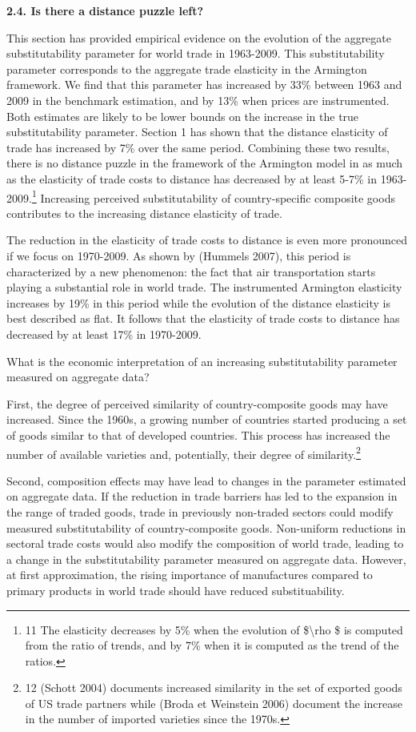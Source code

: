 \documentclass[12pt,twoside,a4paper,notitlepage]{article}
\begin{document}
\textbf{2.4. Is there a distance puzzle left? \label{mark-2.4.}}

This section has provided empirical evidence on the evolution of the aggregate substitutability parameter for world trade in 1963-2009. This substitutability parameter corresponds to the aggregate trade elasticity in the Armington framework. We find that this parameter has increased by 33\% between 1963 and 2009 in the benchmark estimation, and by 13\% when prices are instrumented. Both estimates are likely to be lower bounds on the increase in the true substitutability parameter. Section 1 has shown that the distance elasticity of trade has increased by 7\% over the same period. Combining these two results, there is no distance puzzle in the framework of the Armington model in as much as the elasticity of trade costs to distance has decreased by at least 5-7\% in 1963-2009.\footnote{11 The elasticity decreases by 5\% when the evolution of \$\textbackslash rho \$ is computed from the ratio of trends, and by 7\% when it is computed as the trend of the ratios.
} Increasing perceived substitutability of country-specific composite goods contributes to the increasing distance elasticity of trade.

The reduction in the elasticity of trade costs to distance is even more pronounced if we focus on 1970-2009. As shown by (Hummels 2007), this period is characterized by a new phenomenon: the fact that air transportation starts playing a substantial role in world trade. The instrumented Armington elasticity increases by 19\% in this period while the evolution of the distance elasticity is best described as flat. It follows that the elasticity of trade costs to distance has decreased by at least 17\% in 1970-2009. 

What is the economic interpretation of an increasing substitutability parameter measured on aggregate data? 

First, the degree of perceived similarity of country-composite goods may have increased. Since the 1960s, a growing number of countries started producing a set of goods similar to that of developed countries. This process has increased the number of available varieties and, potentially, their degree of similarity.\footnote{12 (Schott 2004) documents increased similarity in the set of exported goods of US trade partners while (Broda et Weinstein 2006) document the increase in the number of imported varieties since the 1970s.
} 

Second, composition effects may have lead to changes in the parameter estimated on aggregate data. If the reduction in trade barriers has led to the expansion in the range of traded goods, trade in previously non-traded sectors could modify measured substitutability of country-composite goods. Non-uniform reductions in sectoral trade costs would also modify the composition of world trade, leading to a change in the substitutability parameter measured on aggregate data. However, at first approximation, the rising importance of manufactures compared to primary products in world trade should have reduced substituability.
\end{document}
